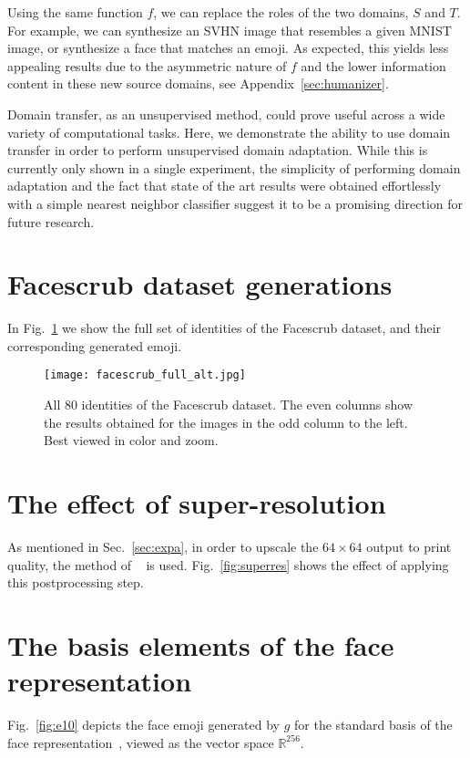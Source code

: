 \documentclass{article} \usepackage{iclr2017_conference,times}
\begin{document}
Using the same function $f$, we can replace the roles of the two domains, $S$ and $T$. For example, we can synthesize an SVHN image that resembles a given MNIST image, or synthesize a face that matches an emoji. As expected, this yields less appealing results due to the asymmetric nature of $f$ and the lower information content in these new source domains, see Appendix~\ref{sec:humanizer}.

Domain transfer, as an unsupervised method, could prove useful across a wide variety of computational tasks. Here, we demonstrate the ability to use domain transfer in order to perform unsupervised domain adaptation. While this is currently only shown in a single experiment, the simplicity of performing domain adaptation and the fact that state of the art results were obtained effortlessly with a simple nearest neighbor classifier suggest it to be a promising direction for future research.




\FloatBarrier

\newpage
\appendix

\section{Facescrub dataset generations}
\label{sec:facescrub}
In Fig.~\ref{fig:allfacescrub} we show the full set of identities of the Facescrub dataset, and their corresponding generated emoji.

\begin{figure}[H]
\centering
\texttt{[image: facescrub\_full\_alt.jpg]}
\caption{\label{fig:allfacescrub}All 80 identities of the Facescrub dataset. The even columns show the results obtained for the images in the odd column to the left. Best viewed in color and zoom.}
\end{figure}


\newpage
\section{The effect of super-resolution}
\label{sec:superres}
As mentioned in Sec.~\ref{sec:expa}, in order to upscale the $64 \times 64$ output to print quality, the method of ~\cite{superres} is used. Fig.~\ref{fig:superres} shows the effect of applying this postprocessing step.
\section{The basis elements of the face representation}
\label{sec:e10}
Fig.~\ref{fig:e10} depicts the face emoji generated by $g$ for the standard basis of the face representation~\citep{deepface}, viewed as the vector space $\mathbb{R}^{256}$. 
\end{document}
